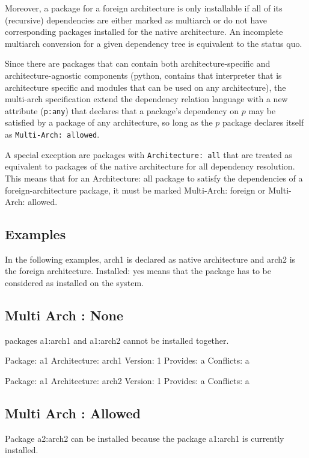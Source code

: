 Moreover, a package for a foreign architecture is only installable if
all of its (recursive) dependencies are either marked as multiarch or
do not have corresponding packages installed for the native
architecture. An incomplete multiarch conversion for a given
dependency tree is equivalent to the status quo. 

Since there are packages that can contain both architecture-specific
and architecture-agnostic components (python, contains that
interpreter that is architecture specific and modules that can be used
on any architecture), the multi-arch specification extend the
dependency relation language with a new attribute (\texttt{p:any})
that declares that a package's dependency on $p$ may be satisfied by a
package of any architecture, so long as the $p$ package declares
itself as \texttt{Multi-Arch: allowed}. 

A special exception are packages with \texttt{Architecture: all} that
are treated as equivalent to packages of the native architecture for
all dependency resolution. This means that for an Architecture: all
package to satisfy the dependencies of a foreign-architecture package,
it must be marked Multi-Arch: foreign or Multi-Arch: allowed. 

\subsection{Examples}

In the following examples, arch1 is declared as native architecture and arch2
is the foreign architecture. Installed: yes means that the package has
to be considered as installed on the system.

\subsection{Multi Arch : None}

packages a1:arch1 and a1:arch2 cannot be installed together.

Package: a1
Architecture: arch1
Version: 1
Provides: a
Conflicts: a

Package: a1
Architecture: arch2
Version: 1
Provides: a
Conflicts: a

\subsection{Multi Arch : Allowed}

Package a2:arch2 can be installed because the package a1:arch1 is currently
installed.

